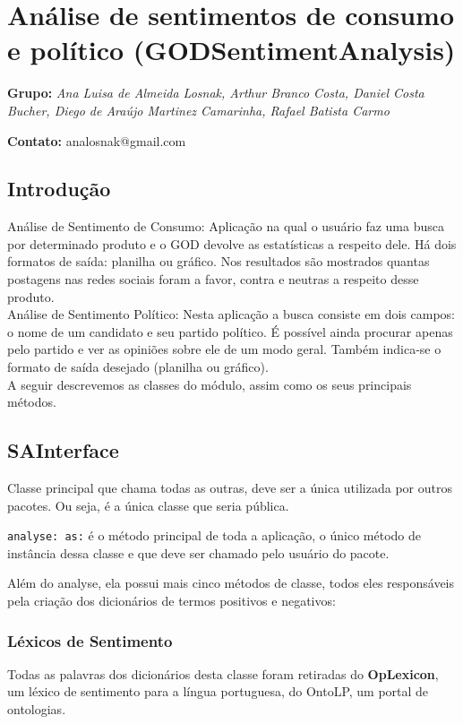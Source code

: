 \section{Análise de sentimentos de consumo e político (GODSentimentAnalysis)}

\textbf{Grupo: }\textit{Ana Luisa de Almeida Losnak, Arthur Branco Costa, Daniel Costa Bucher, Diego de Araújo Martinez Camarinha, Rafael Batista Carmo}

\textbf{Contato: }analosnak@gmail.com


\subsection{Introdução}
Análise de Sentimento de Consumo: Aplicação na qual o usuário faz uma busca por determinado produto e o GOD devolve as estatísticas a respeito dele. Há dois formatos de saída: planilha ou gráfico.
Nos resultados são mostrados quantas postagens nas redes sociais foram a favor, contra e neutras a respeito desse produto.\\

Análise de Sentimento Político: Nesta aplicação a busca consiste em dois campos: o nome de um candidato e seu partido político. É possível ainda procurar apenas pelo partido e ver as opiniões sobre 
ele de um modo geral. Também indica-se o formato de saída desejado (planilha ou gráfico).\\

A seguir descrevemos as classes do módulo, assim como os seus principais métodos.

\subsection{SAInterface}
Classe principal que chama todas as outras, deve ser a única utilizada por outros pacotes. Ou seja, é a única classe que seria pública.

\texttt{analyse: as:} é o método principal de toda a aplicação, o único método de instância dessa classe e que deve ser chamado pelo usuário do pacote.

Além do analyse, ela possui mais cinco métodos de classe, todos eles responsáveis pela criação dos dicionários de termos positivos e negativos:

\subsubsection{Léxicos de Sentimento}
Todas as palavras dos dicionários desta classe foram retiradas do \textbf{OpLexicon}, um léxico de sentimento para a língua portuguesa, do OntoLP, um portal de ontologias.

